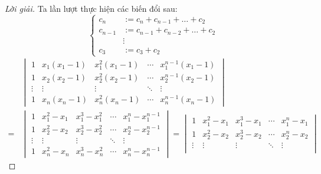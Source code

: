 \documentclass[class=linearalgebra,crop=false]{standalone}
\begin{document}
\begin{proof}[Lời giải]
    \par Ta lần lượt thực hiện các biến đổi sau:
    \[
        \begin{cases}
            c_{n}   & := c_{n} + c_{n-1} + \ldots + c_{2}   \\
            c_{n-1} & := c_{n-1} + c_{n-2} + \ldots + c_{2} \\
                    & \vdots                                \\
            c_{3}   & := c_{3} + c_{2}
        \end{cases}
    \]
    \begingroup
    \allowdisplaybreaks
    \begin{align*}
          & \begin{vmatrix}
                1      & x_{1}(x_{1} - 1) & x_{1}^{2}(x_{1} - 1) & \cdots & x_{1}^{n-1}(x_{1} - 1) \\
                1      & x_{2}(x_{2} - 1) & x_{2}^{2}(x_{2} - 1) & \cdots & x_{2}^{n-1}(x_{2} - 1) \\
                \vdots & \vdots           & \vdots               & \ddots & \vdots                 \\
                1      & x_{n}(x_{n} - 1) & x_{n}^{2}(x_{n} - 1) & \cdots & x_{n}^{n-1}(x_{n} - 1)
            \end{vmatrix}                                                                                                                                               \\
        = &
        \begin{vmatrix}
            1      & x_{1}^{2} - x_{1} & x_{1}^{3} - x_{1}^{2} & \cdots & x_{1}^{n} - x_{1}^{n-1} \\
            1      & x_{2}^{2} - x_{2} & x_{2}^{3} - x_{2}^{2} & \cdots & x_{2}^{n} - x_{2}^{n-1} \\
            \vdots & \vdots            & \vdots                & \ddots & \vdots                  \\
            1      & x_{n}^{2} - x_{n} & x_{n}^{3} - x_{n}^{2} & \cdots & x_{n}^{n} - x_{n}^{n-1}
        \end{vmatrix}
        =
        \begin{vmatrix}
            1      & x_{1}^{2} - x_{1} & x_{1}^{3} - x_{1} & \cdots & x_{1}^{n} - x_{1} \\
            1      & x_{2}^{2} - x_{2} & x_{2}^{3} - x_{2} & \cdots & x_{2}^{n} - x_{2} \\
            \vdots & \vdots            & \vdots            & \ddots & \vdots            \\

\end{vmatrix}
\end{align*}
\end{proof}
\end{document}
